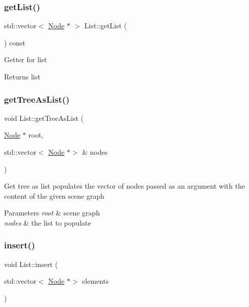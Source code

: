 \subsubsection{\texorpdfstring{get\+List()}{getList()}}
{\footnotesize\ttfamily std\+::vector$<$ \hyperlink{classNode}{Node} $\ast$ $>$ List\+::get\+List (\begin{DoxyParamCaption}{ }\end{DoxyParamCaption}) const}

Getter for list \begin{DoxyReturn}{Returns}
list 
\end{DoxyReturn}
\mbox{\label{classList_a613a58dfe61bbaebe346ef214c23b5cf}} 
\subsubsection{\texorpdfstring{get\+Tree\+As\+List()}{getTreeAsList()}}
{\footnotesize\ttfamily void List\+::get\+Tree\+As\+List (\begin{DoxyParamCaption}\item[{\hyperlink{classNode}{Node} $\ast$}]{root,  }\item[{std\+::vector$<$ \hyperlink{classNode}{Node} $\ast$$>$ \&}]{nodes }\end{DoxyParamCaption})}

Get tree as list populates the vector of nodes passed as an argument with the content of the given scene graph 
\begin{DoxyParams}{Parameters}
{\em root} & scene graph \\
\hline
{\em nodes} & the list to populate \\
\hline
\end{DoxyParams}
\mbox{\label{classList_adde6cc4002cdd88401634f383b4d3411}} 
\subsubsection{\texorpdfstring{insert()}{insert()}}
{\footnotesize\ttfamily void List\+::insert (\begin{DoxyParamCaption}\item[{std\+::vector$<$ \hyperlink{classNode}{Node} $\ast$$>$}]{elements }\end{DoxyParamCaption})}

